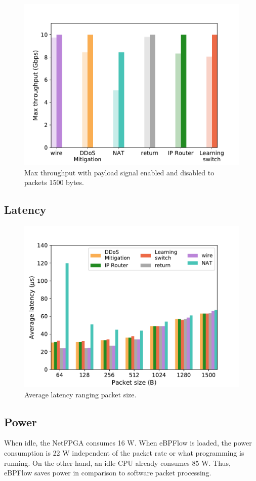 \begin{figure}[ht]
\centering
\includegraphics[width=1.\linewidth]{figures/payload-1500B.pdf}
\caption{Max throughput with  payload signal enabled and disabled to packets 1500 bytes.}
\label{fig:payload-1500B}
\end{figure}

\subsection{Latency}

\begin{figure}[ht]
\centering
\includegraphics[width=1.\linewidth]{figures/latency.pdf}
\caption{Average latency ranging packet size.}
\label{fig:latency}
\end{figure}



\subsection{Power}

When idle, the NetFPGA consumes 16 W.
When eBPFlow is loaded, the power consumption is 22 W independent of the packet rate or what programming is running.
On the other hand, an idle CPU already consumes 85 W.
Thus, eBPFlow saves power in comparison to software packet processing.


